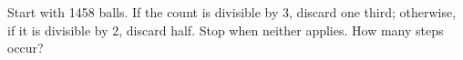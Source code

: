 Start with 1458 balls. If the count is divisible by 3, discard one third; otherwise, if it is divisible by 2, discard half. Stop when neither applies. How many steps occur?
